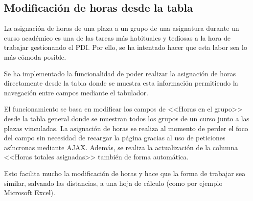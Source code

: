 \subsection{Modificación de horas desde la tabla}
La asignación de horas de una plaza a un grupo de una asignatura durante un curso académico es una de las tareas más habituales y tediosas a la hora de trabajar gestionando el PDI. 
Por ello, se ha intentado hacer que esta labor sea lo más cómoda posible.

Se ha implementado la funcionalidad de poder realizar la asignación de horas directamente desde la tabla donde se muestra esta información permitiendo la navegación entre campos mediante el tabulador.

El funcionamiento se basa en modificar los campos de <<Horas en el grupo>> desde la tabla general donde se muestran todos los grupos de un curso junto a las plazas vinculadas. 
La asignación de horas se realiza al momento de perder el foco del campo sin necesidad de recargar la página gracias al uso de peticiones asíncronas mediante AJAX.
Además, se realiza la actualización de la columna <<Horas totales asignadas>> también de forma automática.

Esto facilita mucho la modificación de horas y hace que la forma de trabajar sea similar, salvando las distancias, a una hoja de cálculo (como por ejemplo Microsoft Excel).

